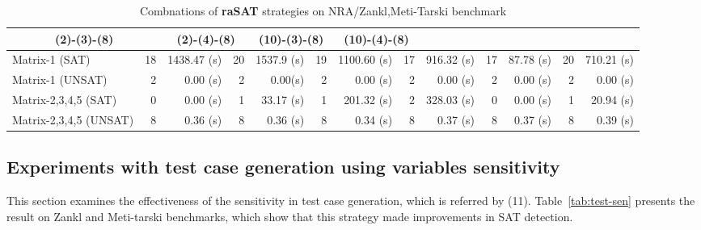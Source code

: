 \documentclass[runningheads,a4paper,oribibl]{llncs}
\begin{document}
\begin{table}[t]
{\begin{tabular}{ | l | r | r | r | r  | r | r | r | r | r | r |r | r |}
    \multicolumn{2}{c|}{(2)-(3)-(8)} & \multicolumn{2}{c|}{(2)-(4)-(8)} & 
    \multicolumn{2}{c|}{(10)-(3)-(8)} & \multicolumn{2}{c|}{(10)-(4)-(8)} \\
\hline
 Matrix-1 (SAT) & 18 & 1438.47 (s) & 20 & 1537.9 (s)& 19 & 1100.60 (s)& 17 & 916.32 (s)& 17 & 87.78 (s)& 20 & 710.21 (s)
\\
\hline
 Matrix-1 (UNSAT) & 2 & 0.00 (s)& 2 & 0.00(s) & 2 & 0.00 (s)& 2 & 0.00 (s)& 2 & 0.00 (s)& 2 & 0.00 (s)
\\
\hline
 Matrix-2,3,4,5 (SAT) & 0 & 0.00 (s)& 1 & 33.17 (s)& 1 & 201.32 (s)& 2 & 328.03 (s)& 0 & 0.00 (s)& 1 & 20.94 (s)
\\
\hline
 Matrix-2,3,4,5 (UNSAT) & 8 & 0.36 (s)& 8 & 0.36 (s)& 8 & 0.34 (s)& 8 & 0.37 (s)& 8 & 0.37 (s)& 8 & 0.39 (s)
\\
\hline
\end{tabular}
}
\bigskip
{}
\medskip
\caption{Combnations of {\bf raSAT} strategies on NRA/Zankl,Meti-Tarski benchmark} 
\label{tab:rasat-experiments}
\end{table}


\subsection*{Experiments with test case generation using variables sensitivity}
This section examines the effectiveness of the sensitivity in test case generation, 
which is referred by (11).
Table~\ref{tab:test-sen} presents the result on Zankl and Meti-tarski
benchmarks, which show that this strategy made improvements in SAT detection. 
\end{document}
